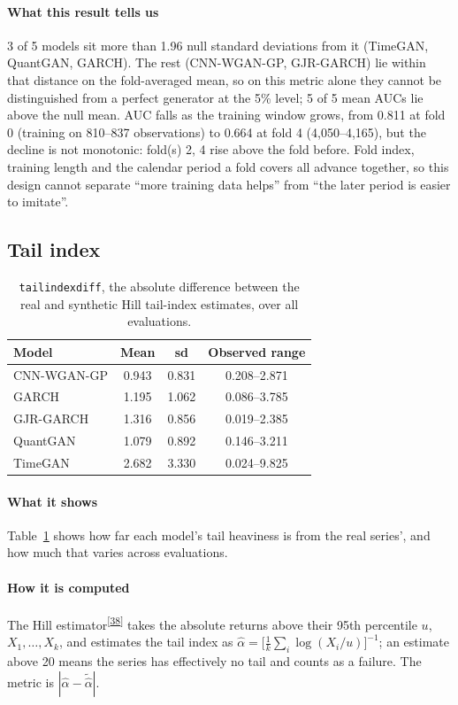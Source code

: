 \documentclass[11pt,a4paper]{article}
\makeatletter
\newcommand{\tcite}[1]{\textsuperscript{[\hyperlink{R:#1}{#1}]}}
\DeclareRobustCommand{\_}{\ifmmode\nfss@text{\textunderscore}\else\textunderscore\allowbreak\fi}
\makeatother
\begin{document}
\paragraph{What this result tells us} 3 of 5 models sit more than 1.96 null standard deviations from it (TimeGAN, QuantGAN, GARCH). The rest (CNN-WGAN-GP, GJR-GARCH) lie within that distance on the fold-averaged mean, so on this metric alone they cannot be distinguished from a perfect generator at the 5\% level; 5 of 5 mean AUCs lie above the null mean. AUC falls as the training window grows, from 0.811 at fold 0 (training on 810--837 observations) to 0.664 at fold 4 (4,050--4,165), but the decline is not monotonic: fold(s) 2, 4 rise above the fold before. Fold index, training length and the calendar period a fold covers all advance together, so this design cannot separate ``more training data helps'' from ``the later period is easier to imitate''.

\subsection{Tail index}
\label{sec:tail}

\begin{table}[htbp]
\centering
\caption{\texttt{tail\_index\_diff}, the absolute difference between the real and synthetic Hill tail-index estimates, over all evaluations.}
\label{tab:tail}
\begin{tabular}{@{}lccc@{}}
\toprule
Model & Mean & sd & Observed range \\
\midrule
CNN-WGAN-GP & 0.943 & 0.831 & 0.208--2.871 \\
GARCH & 1.195 & 1.062 & 0.086--3.785 \\
GJR-GARCH & 1.316 & 0.856 & 0.019--2.385 \\
QuantGAN & 1.079 & 0.892 & 0.146--3.211 \\
TimeGAN & 2.682 & 3.330 & 0.024--9.825 \\
\bottomrule
\end{tabular}
\end{table}

\paragraph{What it shows} Table~\ref{tab:tail} shows how far each model's tail heaviness is from the real series', and how much that varies across evaluations.

\paragraph{How it is computed} The Hill estimator\tcite{38} takes the absolute returns above their 95th percentile $u$, $X_1,\dots,X_k$, and estimates the tail index as $\hat\alpha=\big[\frac1k\sum_i\log(X_i/u)\big]^{-1}$; an estimate above 20 means the series has effectively no tail and counts as a failure. The metric is $|\hat\alpha-\tilde{\hat\alpha}|$.
\end{document}
